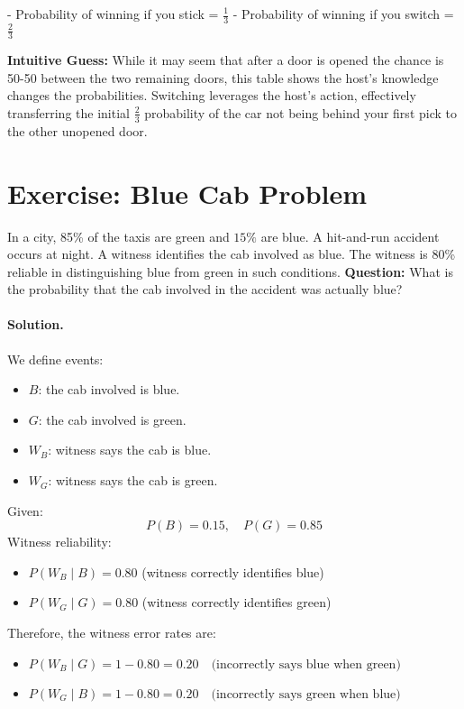 \documentclass[11pt]{article}
\newif\ifshowanswers
\begin{document}
- Probability of winning if you stick = $\frac{1}{3}$
- Probability of winning if you switch = $\frac{2}{3}$

\noindent
\textbf{Intuitive Guess:} While it may seem that after a door is opened the chance is 50-50 between the two remaining doors, this table shows the host’s knowledge changes the probabilities. Switching leverages the host’s action, effectively transferring the initial $\frac{2}{3}$ probability of the car not being behind your first pick to the other unopened door.
\fi


\section{Exercise: Blue Cab Problem}
In a city, 85\% of the taxis are green and $15\%$ are blue. A hit-and-run accident occurs at night. A witness identifies the cab involved as blue. The witness is 80\% reliable in distinguishing blue from green in such conditions.
\textbf{Question:}
What is the probability that the cab involved in the accident was actually blue?

\vspace{1cm}

\ifshowanswers
\paragraph{Solution.}

We define events:

\begin{itemize}
  \item $B$: the cab involved is blue.
  \item $G$: the cab involved is green.
  \item $W_B$: witness says the cab is blue.
  \item $W_G$: witness says the cab is green.
\end{itemize}

Given:
\[
P(B) = 0.15, \quad P(G) = 0.85
\]
Witness reliability:
\begin{itemize}
  \item $P(W_B \mid B) = 0.80$ (witness correctly identifies blue)
  \item $P(W_G \mid G) = 0.80$ (witness correctly identifies green)
\end{itemize}

\noindent
Therefore, the witness error rates are:
\begin{itemize}
  \item $P(W_B \mid G) = 1 - 0.80 = 0.20 \quad \text{(incorrectly says blue when green)}$
  \item $P(W_G \mid B) = 1 - 0.80 = 0.20 \quad \text{(incorrectly says green when blue)}$
\end{itemize}
\end{document}
